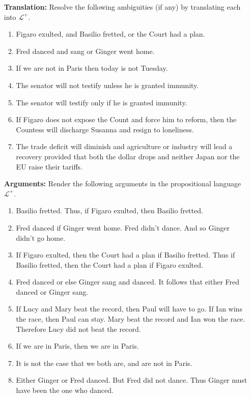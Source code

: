 \documentclass[a4paper, 11pt]{article} %
\begin{document}
\begin{enumerate}[leftmargin=1.2in,labelsep=.15in] 
\item[\bf Translation:] Resolve the following ambiguities (if any) by translating each into $\mathcal{L}^+$.
	\begin{enumerate}[label=(\arabic*)]\small
	\item Figaro exulted, and Basilio fretted, or the Court had a plan.
	\item Fred danced and sang or Ginger went home.
	\item If we are not in Paris then today is not Tuesday.
	\item The senator will not testify unless he is granted immunity.
	\item The senator will testify only if he is granted immunity.
	\item If Figaro does not expose the Count and force him to reform, then the Countess will discharge Susanna and resign to loneliness.
	\item The trade deficit will diminish and agriculture or industry will lead a recovery provided that both the dollar drops and neither Japan nor the EU raise their tariffs.
	\end{enumerate}
\item[\bf Arguments:] Render the following arguments in the propositional language $\mathcal{L}^+$.
	\begin{enumerate}[label=(\arabic*)]\small
	\item Basilio fretted. Thus, if Figaro exulted, then Basilio fretted.
	\item Fred danced if Ginger went home. Fred didn't dance. And so Ginger didn't go home.
	\item If Figaro exulted, then the Court had a plan if Basilio fretted. Thus if Basilio fretted, then the Court had a plan if Figaro exulted.
	\item Fred danced or else Ginger sang and danced. It follows that either Fred danced or Ginger sang.
	\item If Lucy and Mary beat the record, then Paul will have to go. If Ian wins the race, then Paul can stay. Mary beat the record and Ian won the race. Therefore Lucy did not beat the record.
	\item If we are in Paris, then we are in Paris.
	\item It is not the case that we both are, and are not in Paris.
	\item Either Ginger or Fred danced. But Fred did not dance. Thus Ginger must have been the one who danced.

\end{enumerate}
\end{enumerate}
\end{document}
